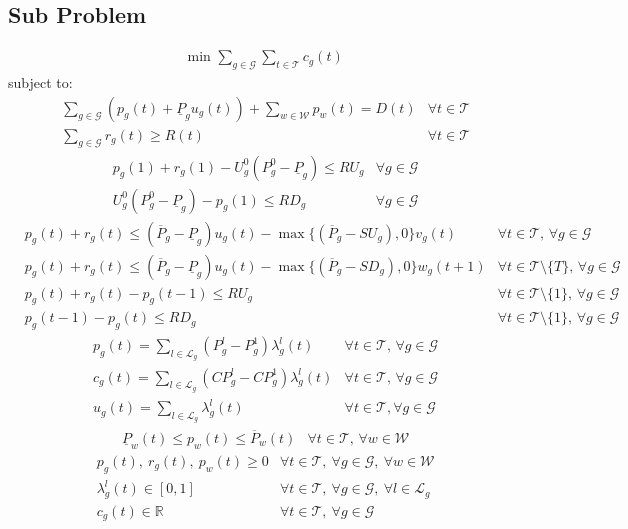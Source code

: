 \documentclass[a4paper,12pt]{article}
\newcommand{\cG}{\mathcal{G}}
\newcommand{\cT}{\mathcal{T}}
\newcommand{\cW}{\mathcal{W}}
\newcommand{\cL}{\mathcal{L}}
\newcommand{\uPP}{\underline{P}}
\newcommand{\oPP}{\overline{P}}
\begin{document}
\newpage
\subsection*{Sub Problem}
{\allowdisplaybreaks
\begin{align}
    & \text{min } \sum_{g \in \cG} \sum_{t \in \cT} c_g(t)  \label{eq:sub_obj}
\end{align}
subject to:
\begin{align}
    & \sum_{g \in \cG} \left( p_g(t) + \uPP_g u_g(t) \right) + \sum_{w\in\cW} p_w(t) = D(t) & \forall t \in \cT \label{eq:UCDemand} \\
    & \sum_{g \in \cG} r_g(t) \geq R(t) &  \forall t \in \cT \label{eq:UCReserves}
\end{align}
\begin{align}
    & p_g(1) + r_g(1) - U_g^0(P_g^0-\uPP_g) \leq RU_g & \forall g \in \cG \label{eq:RampUpInit} \\
    & U_g^0(P_g^0-\uPP_g) - p_g(1) \leq RD_g & \forall g \in \cG \label{eq:RampDownInit}
\end{align}
\begin{align}
    & p_g(t) + r_g(t) \leq (\oPP_g - \uPP_g) u_g(t) - \max\{(\oPP_g - SU_g),0\} v_g(t) & \forall t \in \cT, \, \forall g \in \cG \label{eq:MaxOutput1} \\
    & p_g(t) + r_g(t) \leq (\oPP_g - \uPP_g) u_g(t) - \max\{(\oPP_g - SD_g),0\} w_g(t+1) & \forall t \in \cT\setminus \{T\}, \, \forall g \in \cG \label{eq:MaxOutput2} \\
    & p_g(t) + r_g(t) - p_g(t-1) \leq RU_g & \forall t \in \cT\setminus\{1\}, \, \forall g \in \cG \label{eq:RampUp} \\
    & p_g(t-1) - p_g(t) \leq RD_g & \forall t \in \cT\setminus\{1\}, \, \forall g \in \cG \label{eq:RampDown}
\end{align}
\begin{align}
    & p_g(t) = \sum_{l \in \cL_g} (P_g^l - P_g^1) \lambda_g^l(t) & \forall t \in \cT, \, \forall g \in \cG \label{eq:PiecewiseParts} \\
    & c_g(t) = \sum_{l \in \cL_g} (CP_g^l - CP_g^1) \lambda_g^l(t) & \forall t \in \cT, \, \forall g \in \cG \label{eq:PiecewisePartsCost} \\
    & u_g(t) = \sum_{l \in \cL_g} \lambda_g^l(t) & \forall t \in \cT, \forall g \in \cG \label{eq:PiecewiseLimits}
\end{align}
\begin{align}
    & \uPP_w(t) \leq p_w(t) \leq \oPP_w(t) & \forall t \in \cT, \, \forall w \in \cW \label{eq:WindLimit}
\end{align}
\begin{align}
    & p_g(t),\ r_g(t),\ p_w(t) \geq 0 & \forall t \in \cT,\ \forall g \in \cG,\ \forall w \in \cW \label{eq:NonNegativity} \\
    & \lambda_g^l(t) \in [0,1] & \forall t \in \cT,\ \forall g \in \cG,\ \forall l \in \cL_g \label{eq:LambdaBounds} \\
    & c_g(t) \in \mathbb{R} & \forall t \in \cT,\ \forall g \in \cG \label{eq:CostVariable}
\end{align}
}
\end{document}
